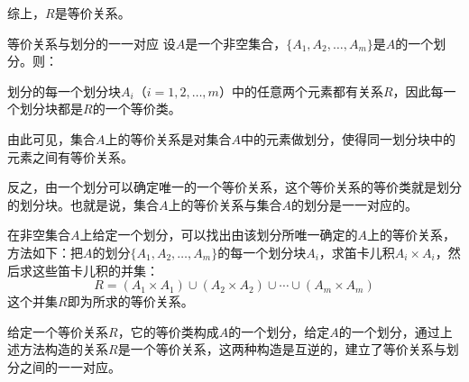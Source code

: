 \documentclass[lang=cn,11pt]{elegantbook}
\begin{document}
综上，$R$是等价关系。
\begin{theorem}{等价关系与划分的一一对应}
设$A$是一个非空集合，$\{A_1, A_2, \ldots, A_m\}$是$A$的一个划分。则：

划分的每一个划分块$A_i$（$i=1,2,\ldots,m$）中的任意两个元素都有关系$R$，因此每一个划分块都是$R$的一个等价类。
    
由此可见，集合$A$上的等价关系是对集合$A$中的元素做划分，使得同一划分块中的元素之间有等价关系。
    
反之，由一个划分可以确定唯一的一个等价关系，这个等价关系的等价类就是划分的划分块。也就是说，集合$A$上的等价关系与集合$A$的划分是一一对应的。
    
在非空集合$A$上给定一个划分，可以找出由该划分所唯一确定的$A$上的等价关系，方法如下：把$A$的划分$\{A_1, A_2, \ldots, A_m\}$的每一个划分块$A_i$，求笛卡儿积$A_i \times A_i$，然后求这些笛卡儿积的并集：
    \[
    R = (A_1 \times A_1) \cup (A_2 \times A_2) \cup \cdots \cup (A_m \times A_m)
    \]
这个并集$R$即为所求的等价关系。
\end{theorem}
给定一个等价关系$R$，它的等价类构成$A$的一个划分，给定$A$的一个划分，通过上述方法构造的关系$R$是一个等价关系，这两种构造是互逆的，建立了等价关系与划分之间的一一对应。
\end{document}
